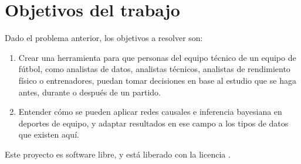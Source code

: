 \section{Objetivos del trabajo} \label{sect:goals}

Dado el problema anterior, los objetivos a resolver son:

\begin{enumerate}
    \item \label{obj:1} Crear una herramienta para que personas del equipo técnico de un equipo de fútbol, como analistas de datos, analistas técnicos, analistas de rendimiento 
    físico o entrenadores, puedan tomar decisiones en base al estudio que se haga antes, durante 
    o después de un partido. 
    \item \label{obj:2} Entender cómo se pueden aplicar redes causales e inferencia 
    bayesiana en deportes de equipo, y adaptar resultados en ese campo a 
    los tipos de datos que existen aquí.
\end{enumerate}



Este proyecto es software libre, y está liberado con la licencia \cite{gplv3}.
